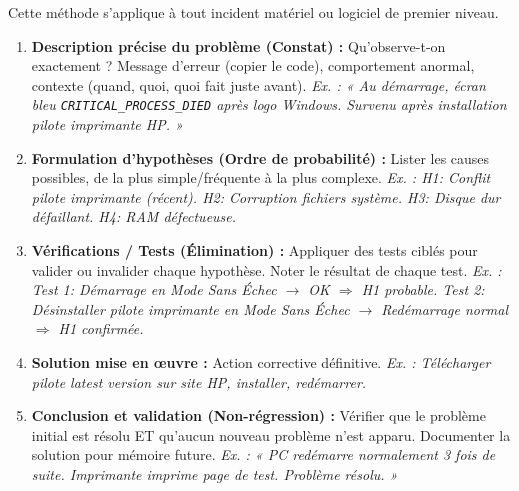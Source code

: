 \documentclass[11pt]{article}
\begin{document}
\begin{methode}
Cette méthode s'applique à tout incident matériel ou logiciel de premier niveau.

\begin{enumerate}
    \item \textbf{Description précise du problème (Constat) :} Qu'observe-t-on exactement ? Message d'erreur (copier le code), comportement anormal, contexte (quand, quoi, quoi fait juste avant). \emph{Ex. : « Au démarrage, écran bleu \texttt{CRITICAL\_PROCESS\_DIED} après logo Windows. Survenu après installation pilote imprimante HP. »}
    \item \textbf{Formulation d'hypothèses (Ordre de probabilité) :} Lister les causes possibles, de la plus simple/fréquente à la plus complexe. \emph{Ex. : H1: Conflit pilote imprimante (récent). H2: Corruption fichiers système. H3: Disque dur défaillant. H4: RAM défectueuse.}
    \item \textbf{Vérifications / Tests (Élimination) :} Appliquer des tests ciblés pour valider ou invalider chaque hypothèse. Noter le résultat de chaque test. \emph{Ex. : Test 1: Démarrage en Mode Sans Échec $\to$ OK $\Rightarrow$ H1 probable. Test 2: Désinstaller pilote imprimante en Mode Sans Échec $\to$ Redémarrage normal $\Rightarrow$ H1 confirmée.}
    \item \textbf{Solution mise en œuvre :} Action corrective définitive. \emph{Ex. : Télécharger pilote latest version sur site HP, installer, redémarrer.}
    \item \textbf{Conclusion et validation (Non-régression) :} Vérifier que le problème initial est résolu ET qu'aucun nouveau problème n'est apparu. Documenter la solution pour mémoire future. \emph{Ex. : « PC redémarre normalement 3 fois de suite. Imprimante imprime page de test. Problème résolu. »}
\end{enumerate}
\end{methode}
\end{document}
